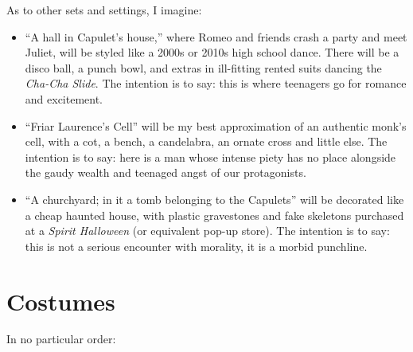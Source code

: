 As to other sets and settings, I imagine:

\begin{itemize}
\item \enquote{A hall in Capulet's house,} where Romeo and friends crash a party and meet
  Juliet, will be styled like a 2000s or 2010s high school dance. There will be a disco
  ball, a punch bowl, and extras in ill-fitting rented suits dancing the \textit{Cha-Cha
    Slide}. The intention is to say: this is where teenagers go for romance and
  excitement.
\item \enquote{Friar Laurence's Cell} will be my best approximation of an authentic monk's
  cell, with a cot, a bench, a candelabra, an ornate cross and little else. The intention
  is to say: here is a man whose intense piety has no place alongside the gaudy wealth and
  teenaged angst of our protagonists.
\item \enquote{A churchyard; in it a tomb belonging to the Capulets} will be decorated
  like a cheap haunted house, with plastic gravestones and fake skeletons purchased at a
  \textit{Spirit Halloween} (or equivalent pop-up store). The intention is to say: this is
  not a serious encounter with morality, it is a morbid punchline.
\end{itemize}

\section*{Costumes}

In no particular order:

